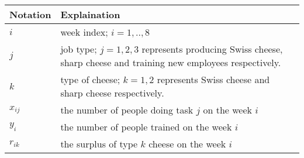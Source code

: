 \documentclass[11pt]{article}
\begin{document}
\begin{longtable}[]{@{}ll@{}}
\toprule
\begin{minipage}[b]{0.47\columnwidth}\raggedright
Notation\strut
\end{minipage} & \begin{minipage}[b]{0.47\columnwidth}\raggedright
Explaination\strut
\end{minipage}\tabularnewline
\midrule
\endhead
\begin{minipage}[t]{0.47\columnwidth}\raggedright
\(i\)\strut
\end{minipage} & \begin{minipage}[t]{0.47\columnwidth}\raggedright
week index; \(i=1,..,8\)\strut
\end{minipage}\tabularnewline
\begin{minipage}[t]{0.47\columnwidth}\raggedright
\(j\)\strut
\end{minipage} & \begin{minipage}[t]{0.47\columnwidth}\raggedright
job type; \(j=1,2,3\) represents producing Swiss cheese, sharp cheese
and training new employees respectively.\strut
\end{minipage}\tabularnewline
\begin{minipage}[t]{0.47\columnwidth}\raggedright
\(k\)\strut
\end{minipage} & \begin{minipage}[t]{0.47\columnwidth}\raggedright
type of cheese; \(k=1,2\) represents Swiss cheese and sharp cheese
respectively.\strut
\end{minipage}\tabularnewline
\begin{minipage}[t]{0.47\columnwidth}\raggedright
\(x_{ij}\)\strut
\end{minipage} & \begin{minipage}[t]{0.47\columnwidth}\raggedright
the number of people doing task \(j\) on the week \(i\)\strut
\end{minipage}\tabularnewline
\begin{minipage}[t]{0.47\columnwidth}\raggedright
\(y_{i}\)\strut
\end{minipage} & \begin{minipage}[t]{0.47\columnwidth}\raggedright
the number of people trained on the week \(i\)\strut
\end{minipage}\tabularnewline
\begin{minipage}[t]{0.47\columnwidth}\raggedright
\(r_{ik}\)\strut
\end{minipage} & \begin{minipage}[t]{0.47\columnwidth}\raggedright
the surplus of type \(k\) cheese on the week \(i\)\strut
\end{minipage}\tabularnewline
\bottomrule
\end{longtable}
\end{document}
